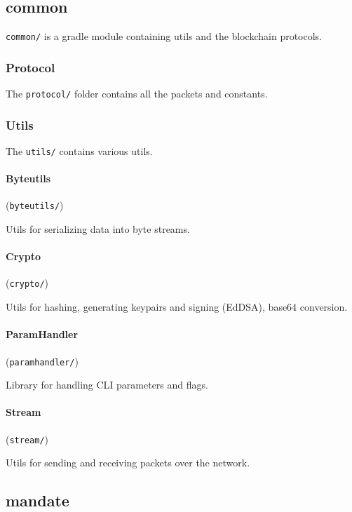 \documentclass[../documentation.tex]{subfiles}
\begin{document}

\subsection{common}

\texttt{common/} is a gradle module containing utils and
the blockchain protocols.

\subsubsection{Protocol}

The \texttt{protocol/} folder contains all the packets and constants.

\subsubsection{Utils}

The \texttt{utils/} contains various utils.

\paragraph{Byteutils} (\texttt{byteutils/})

Utils for serializing data into byte streams.

\paragraph{Crypto} (\texttt{crypto/})

Utils for hashing, generating keypairs and signing (EdDSA), base64 conversion.

\paragraph{ParamHandler} (\texttt{paramhandler/})

Library for handling CLI parameters and flags.

\paragraph{Stream} (\texttt{stream/})

Utils for sending and receiving packets over the network.

\subsection{mandate}
\end{document}
